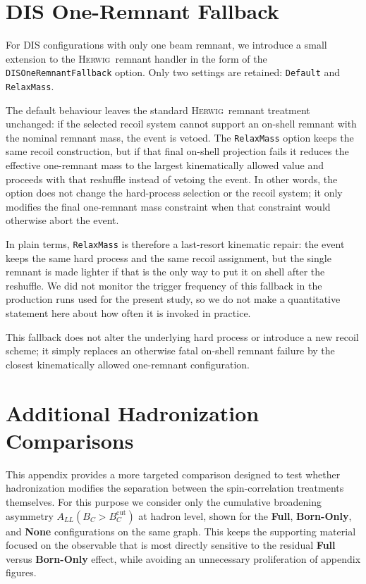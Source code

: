 \documentclass[a4paper,11pt]{article}
\newcommand{\Herwig}{\textsc{Herwig}}
\begin{document}
\section{DIS One-Remnant Fallback}
\label{app:dis-remnant-fallback}

For DIS configurations with only one beam remnant, we introduce a small extension
to the \Herwig\ remnant handler in the form of the
\texttt{DISOneRemnantFallback} option. Only two settings are retained:
\texttt{Default} and \texttt{RelaxMass}.

The default behaviour leaves the standard \Herwig\ remnant treatment unchanged:
if the selected recoil system cannot support an on-shell remnant with the
nominal remnant mass, the event is vetoed. The \texttt{RelaxMass} option keeps
the same recoil construction, but if that final on-shell projection fails it
reduces the effective one-remnant mass to the largest kinematically allowed
value and proceeds with that reshuffle instead of vetoing the event. In other
words, the option does not change the hard-process selection or the recoil
system; it only modifies the final one-remnant mass constraint when that
constraint would otherwise abort the event.

In plain terms, \texttt{RelaxMass} is therefore a last-resort kinematic repair:
the event keeps the same hard process and the same recoil assignment, but the
single remnant is made lighter if that is the only way to put it on shell after
the reshuffle. We did not monitor the trigger frequency of this fallback in the
production runs used for the present study, so we do not make a quantitative
statement here about how often it is invoked in practice.

This fallback does not alter the underlying hard process or introduce a new recoil scheme;
it simply replaces an otherwise fatal on-shell remnant failure by the closest
kinematically allowed one-remnant configuration.

\section{Additional Hadronization Comparisons}
\label{app:hadronization-extra}

This appendix provides a more targeted comparison designed to test
whether hadronization modifies the separation between the spin-correlation
treatments themselves. For this purpose we consider only the cumulative
broadening asymmetry $A_{LL}(B_C > B_C^{\mathrm{cut}})$ at hadron level, shown
for the \textbf{Full}, \textbf{Born-Only}, and \textbf{None} configurations on
the same graph. This keeps the supporting material focused on the observable
that is most directly sensitive to the residual \textbf{Full} versus
\textbf{Born-Only} effect, while avoiding an unnecessary proliferation of
appendix figures.
\end{document}
